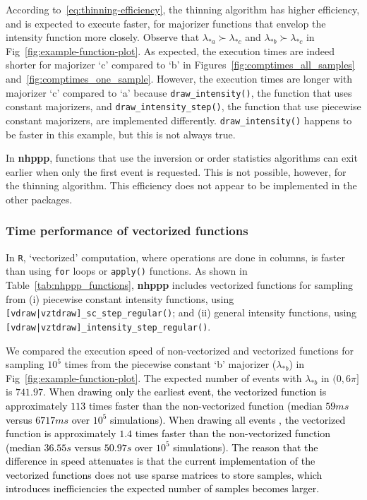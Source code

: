 \documentclass[10pt,letterpaper]{article}
\newcommand{\pkg}[1]{{\bf #1}}
\newcommand{\proglang}[1]{\texttt{#1}}
\newcommand{\fct}[1]{\texttt{#1()}}
\newcommand{\code}[1]{\texttt{#1}}
\newcommand{\red}[1]{\textcolor{black}{#1}}
\begin{document}
According to~\eqref{eq:thinning-efficiency}, the thinning algorithm has higher efficiency, and is expected to execute faster, for majorizer functions that envelop the intensity function more closely. Observe that $\lambda_{*a} \succ \lambda_{*c}$ and $\lambda_{*b} \succ \lambda_{*c}$ in Fig~\ref{fig:example-function-plot}. As expected, the execution times are indeed shorter for majorizer `c' compared to `b' in Figures~\ref{fig:comptimes_all_samples} and~\ref{fig:comptimes_one_sample}. However, the execution times are longer with majorizer `c' compared to `a' because \fct{draw\_intensity}, the function that uses constant majorizers, and \fct{draw\_intensity\_step}, the function that use piecewise constant majorizers, are implemented differently. \fct{draw\_intensity} happens to be faster in this example, but this is not always true.

In \pkg{nhppp}, functions that use the inversion or order statistics algorithms can exit earlier when only the first event is requested. This is not possible, however, for the thinning algorithm. This efficiency does not appear to be implemented in the other packages.




\subsubsection{Time performance of vectorized functions}\label{sec:vectorized-functions}



In \proglang{R}, `vectorized' computation, where operations are done in columns, is faster than using \code{for} loops or \fct{apply} functions. As shown in Table~\ref{tab:nhppp_functions}, \pkg{nhppp} includes vectorized functions for sampling from (i) piecewise constant intensity functions, using \fct{[vdraw|vztdraw]\_sc\_step\_regular}; and (ii) general intensity functions, using \fct{[vdraw|vztdraw]\_intensity\_step\_regular}. 

We compared the execution speed of non-vectorized and vectorized functions for sampling $\ensuremath{10^{5}}$ times from the piecewise constant `b' majorizer ($\lambda_{*b}$) in Fig~\ref{fig:example-function-plot}. The expected number of events with $\lambda_{*b}$ in $(0, 6\pi]$ is
$741.97$.
%
\red{When drawing only the earliest event, the vectorized function is approximately
$113$ times faster than the non-vectorized function (median $59 ms$ versus $6717 ms$ over $\ensuremath{10^{5}}$ simulations).
%
When drawing all events , the vectorized function is approximately $1.4$ times faster than the non-vectorized function (median $36.55 s$ versus $50.97 s$ over $\ensuremath{10^{5}}$ simulations). The reason that the difference in speed attenuates is that the current implementation of the vectorized functions does not use sparse matrices to store samples, which introduces inefficiencies the  expected number of samples becomes larger.}
\end{document}
